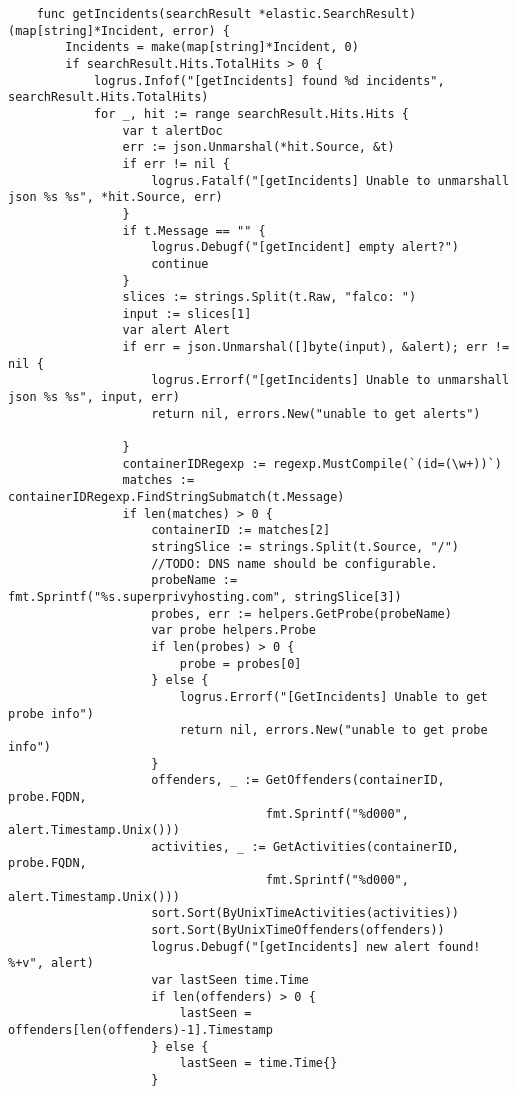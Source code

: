 \begin{verbatim}
    func getIncidents(searchResult *elastic.SearchResult) (map[string]*Incident, error) {
        Incidents = make(map[string]*Incident, 0)
        if searchResult.Hits.TotalHits > 0 {
            logrus.Infof("[getIncidents] found %d incidents", searchResult.Hits.TotalHits)
            for _, hit := range searchResult.Hits.Hits {
                var t alertDoc
                err := json.Unmarshal(*hit.Source, &t)
                if err != nil {
                    logrus.Fatalf("[getIncidents] Unable to unmarshall json %s %s", *hit.Source, err)
                }
                if t.Message == "" {
                    logrus.Debugf("[getIncident] empty alert?")
                    continue
                }
                slices := strings.Split(t.Raw, "falco: ")
                input := slices[1]
                var alert Alert
                if err = json.Unmarshal([]byte(input), &alert); err != nil {
                    logrus.Errorf("[getIncidents] Unable to unmarshall json %s %s", input, err)
                    return nil, errors.New("unable to get alerts")

                }
                containerIDRegexp := regexp.MustCompile(`(id=(\w+))`)
                matches := containerIDRegexp.FindStringSubmatch(t.Message)
                if len(matches) > 0 {
                    containerID := matches[2]
                    stringSlice := strings.Split(t.Source, "/")
                    //TODO: DNS name should be configurable.
                    probeName := fmt.Sprintf("%s.superprivyhosting.com", stringSlice[3])
                    probes, err := helpers.GetProbe(probeName)
                    var probe helpers.Probe
                    if len(probes) > 0 {
                        probe = probes[0]
                    } else {
                        logrus.Errorf("[GetIncidents] Unable to get probe info")
                        return nil, errors.New("unable to get probe info")
                    }
                    offenders, _ := GetOffenders(containerID, probe.FQDN,
                                    fmt.Sprintf("%d000", alert.Timestamp.Unix()))
                    activities, _ := GetActivities(containerID, probe.FQDN,
                                    fmt.Sprintf("%d000", alert.Timestamp.Unix()))
                    sort.Sort(ByUnixTimeActivities(activities))
                    sort.Sort(ByUnixTimeOffenders(offenders))
                    logrus.Debugf("[getIncidents] new alert found! %+v", alert)
                    var lastSeen time.Time
                    if len(offenders) > 0 {
                        lastSeen = offenders[len(offenders)-1].Timestamp
                    } else {
                        lastSeen = time.Time{}
                    }


\end{verbatim}
